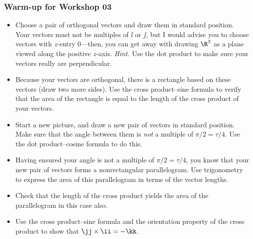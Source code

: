 \documentclass[11pt,ignorenonframetext,]{beamer}
\begin{document}
\begin{frame}\frametitle{Warm-up for Workshop 03}

\begin{itemize}[<+->]
\item
  Choose a pair of orthogonal vectors and draw them in standard
  position. Your vectors must not be multiples of $\ii$ or $\jj$, but I
  would advise you to choose vectors with $z$-entry $0$---then, you can
  get away with drawing $\R^{3}$ as a plane viewed along the positive
  $z$-axis. \emph{Hint.} Use the dot product to make sure your vectors
  really are perpendicular.
\item
  Because your vectors are orthogonal, there is a rectangle based on
  these vectors (draw two more sides). Use the cross product--sine
  formula to verify that the area of the rectangle is equal to the
  length of the cross product of your vectors.
\item
  Start a new picture, and draw a new pair of vectors in standard
  position. Make sure that the angle between them is \emph{not} a
  multiple of $\pi/2 = \tau/4$. Use the dot product--cosine formula to
  do this.
\item
  Having ensured your angle is not a multiple of $\pi/2 = \tau/4$, you
  know that your new pair of vectors forms a nonrectangular
  parallelogram. Use trigonometry to express the area of this
  parallelogram in terms of the vector lengths.
\item
  Check that the length of the cross product yields the area of the
  parallelogram in this case also.
\item
  Use the cross product--sine formula and the orientation property of
  the cross product to show that $\jj \times \ii = -\kk$.
\end{itemize}

\end{frame}
\end{document}
